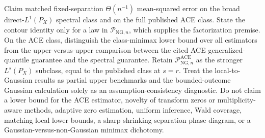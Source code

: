 Claim matched fixed-separation \(\Theta(n^{-1})\) mean-squared error on the broad direct-\(L^1(P_X)\) spectral class and on the full published ACE class.  State the contour identity only for a law in \(\mathcal P_{\mathrm{NG},n}\), which supplies the factorization premise.  On the ACE class, distinguish the class-minimax lower bound over all estimators from the upper-versus-upper comparison between the cited ACE generalized-quantile guarantee and the spectral guarantee.  Retain \(\mathcal P_{\mathrm{NG},n}^{\mathrm{ACE}}\) as the stronger \(L^s(P_X)\) subclass, equal to the published class at \(s=r\).  Treat the local-to-Gaussian results as partial upper benchmarks and the bounded-outcome Gaussian calculation solely as an assumption-consistency diagnostic.  Do not claim a lower bound for the ACE estimator, novelty of transform zeros or multiplicity-aware methods, adaptive zero estimation, uniform inference, Wald coverage, matching local lower bounds, a sharp shrinking-separation phase diagram, or a Gaussian-versus-non-Gaussian minimax dichotomy.